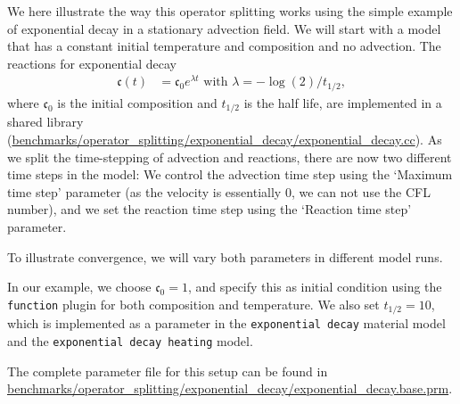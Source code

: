 \documentclass{article}
\begin{document}
We here illustrate the way this operator splitting works using the simple example of exponential decay in a stationary advection field. We will start with a model that has a constant initial temperature and composition and no advection. The reactions for exponential decay 
\begin{align}
  \mathfrak{c}(t) 
  &=
  \mathfrak{c}_0 e^{\lambda t} \text{ with } \lambda = - \log(2)/t_{1/2}, 
\end{align}
where $\mathfrak{c}_0$ is the initial composition and $t_{1/2}$ is the half life, are implemented in a shared library
(\url{benchmarks/operator_splitting/exponential_decay/exponential_decay.cc}). 
As we split the time-stepping of advection and reactions, there are now two different time steps in the model:
We control the advection time step using the `Maximum time step' parameter (as the velocity is essentially 0, 
we can not use the CFL number), and we set the reaction time step using the `Reaction time step' parameter. 

To illustrate convergence, we will vary both parameters in different model runs. 

In our example, we choose $\mathfrak{c}_0=1$, and specify this as initial condition using the \texttt{function} plugin for both composition and temperature. We also set $t_{1/2}=10$, which is implemented as a parameter in the \texttt{exponential decay} material model and the \texttt{exponential decay heating} model. 

The complete parameter file for this setup can be found in \url{benchmarks/operator_splitting/exponential_decay/exponential_decay.base.prm}.
\end{document}
